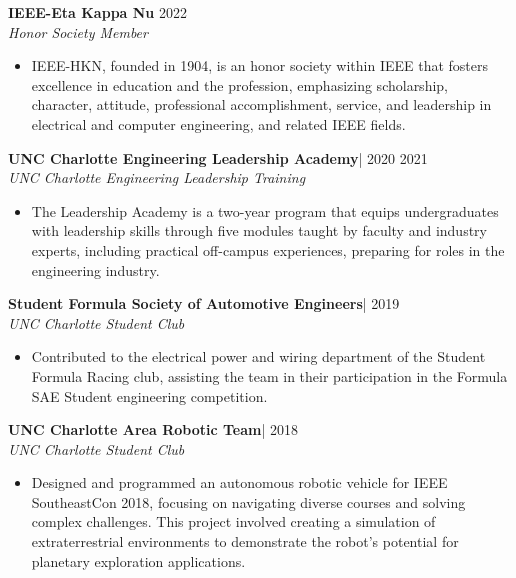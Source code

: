 \documentclass[10pt]{article}
\begin{document}
\textbf{\large IEEE-Eta Kappa Nu} \hfill {2022}\\
\emph{Honor Society Member}
\begin{itemize}
        \item[{\color[RGB]{10,0,254}$\bullet$}] \noindent IEEE-HKN, founded in 1904, is an honor society within IEEE that fosters excellence in education and the profession, emphasizing scholarship, character, attitude, professional accomplishment, service, and leadership in electrical and computer engineering, and related IEEE fields.
	\end{itemize}
\textbf{\large UNC Charlotte Engineering Leadership Academy}|  \hfill {2020 \textendash{} 2021}\\
\emph{UNC Charlotte Engineering Leadership Training}
\begin{itemize}
        \item[{\color[RGB]{10,0,254}$\bullet$}] \noindent The Leadership Academy is a two-year program that equips undergraduates with leadership skills through five modules taught by faculty and industry experts, including practical off-campus experiences, preparing for roles in the engineering industry.
	\end{itemize}
\textbf{\large Student Formula Society of Automotive Engineers}|   \hfill {2019}\\
\emph{UNC Charlotte Student Club}
\begin{itemize}
        \item[{\color[RGB]{10,0,254}$\bullet$}] \noindent Contributed to the electrical power and wiring department of the Student Formula Racing club, assisting the team in their participation in the Formula SAE Student engineering competition.
	\end{itemize}
\textbf{\large UNC Charlotte Area Robotic Team}|   \hfill {2018}\\
\emph{UNC Charlotte Student Club}
\begin{itemize}
        \item[{\color[RGB]{10,0,254}$\bullet$}] \noindent Designed and programmed an autonomous robotic vehicle for IEEE SoutheastCon 2018, focusing on navigating diverse courses and solving complex challenges. This project involved creating a simulation of extraterrestrial environments to demonstrate the robot's potential for planetary exploration applications.
	\end{itemize}
\end{document}
